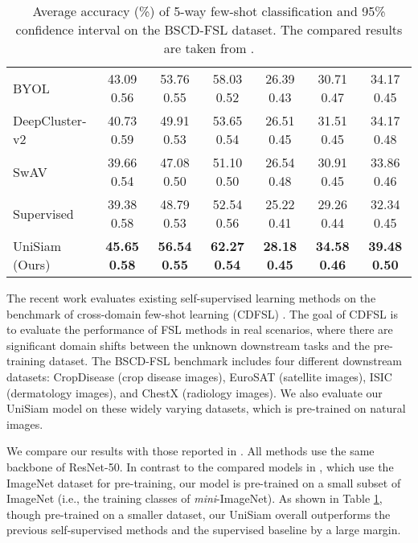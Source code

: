 \documentclass[runningheads]{llncs}
\begin{document}
\begin{table}[t]
{\begin{tabular}{lccc|ccc}
    BYOL                &              43.09  0.56 &  53.76  0.55 &   58.03  0.52 &              26.39  0.43 &              30.71  0.47 &  34.17  0.45 \\
    DeepCluster-v2      &              40.73  0.59 &              49.91  0.53 &              53.65  0.54 &  26.51  0.45 &     31.51  0.45 &     34.17  0.48 \\
    SwAV                &              39.66  0.54 &              47.08  0.50 &              51.10  0.50 &    26.54  0.48 & 30.91  0.45 &            33.86  0.46 \\
    Supervised          &              39.38  0.58 &              48.79  0.53 &              52.54  0.56 &              25.22  0.41 &              29.26  0.44 &              32.34  0.45 \\
 \midrule
   UniSiam (Ours)  & \textbf{45.65  0.58} & \textbf{56.54  0.55} & \textbf{62.27  0.54} & \textbf{28.18  0.45} & \textbf{34.58  0.46} & \textbf{ 39.48  0.50}\\
    \bottomrule
    \end{tabular}
    }
        \caption{\label{cdfsl}Average accuracy (\%) of 5-way few-shot classification and 95\% confidence interval on the BSCD-FSL dataset. The compared results are taken from \cite{ericsson2020how}.}
\end{table}
The recent work \cite{ericsson2020how} evaluates existing self-supervised learning methods on the benchmark of cross-domain few-shot learning (CDFSL) \cite{guo2020a}. The goal of CDFSL is to evaluate the performance of FSL methods in real scenarios, where there are significant domain shifts between the unknown downstream tasks and the pre-training dataset. The BSCD-FSL benchmark \cite{guo2020a} includes four different downstream datasets: CropDisease (crop disease images), EuroSAT (satellite images), ISIC (dermatology images), and ChestX (radiology images).
We also evaluate our UniSiam model on these widely varying datasets, which is pre-trained on natural images.

We compare our results with those reported in \cite{ericsson2020how}. All methods use the same backbone of ResNet-50.  In contrast to the compared models in \cite{ericsson2020how}, which use the ImageNet \cite{russakovsky2015imagenet} dataset for pre-training, our model is pre-trained on a small subset of ImageNet (i.e., the training classes of \emph{mini}-ImageNet). As shown in Table \ref{cdfsl}, though pre-trained on a smaller dataset, our UniSiam overall outperforms the previous self-supervised methods and the supervised baseline by a large margin.
\end{document}
